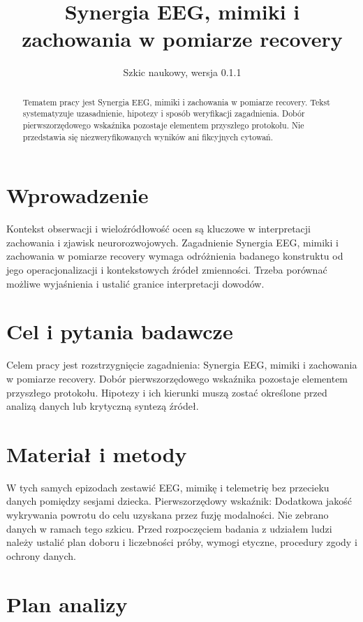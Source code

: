 \documentclass[11pt,a4paper]{article}
\title{Synergia EEG, mimiki i zachowania w pomiarze recovery}
\author{}
\date{Szkic naukowy, wersja 0.1.1}
\begin{document}
\maketitle

\begin{abstract}

Tematem pracy jest Synergia EEG, mimiki i zachowania w pomiarze recovery. Tekst systematyzuje uzasadnienie, hipotezy i sposób weryfikacji zagadnienia. Dobór pierwszorzędowego wskaźnika pozostaje elementem przyszłego protokołu. Nie przedstawia się niezweryfikowanych wyników ani fikcyjnych cytowań.

\end{abstract}

\section{Wprowadzenie}

Kontekst obserwacji i wieloźródłowość ocen są kluczowe w interpretacji zachowania i zjawisk neurorozwojowych. Zagadnienie Synergia EEG, mimiki i zachowania w pomiarze recovery wymaga odróżnienia badanego konstruktu od jego operacjonalizacji i kontekstowych źródeł zmienności. Trzeba porównać możliwe wyjaśnienia i ustalić granice interpretacji dowodów.

\section{Cel i pytania badawcze}

Celem pracy jest rozstrzygnięcie zagadnienia: Synergia EEG, mimiki i zachowania w pomiarze recovery. Dobór pierwszorzędowego wskaźnika pozostaje elementem przyszłego protokołu. Hipotezy i ich kierunki muszą zostać określone przed analizą danych lub krytyczną syntezą źródeł.

\section{Materiał i metody}

W tych samych epizodach zestawić EEG, mimikę i telemetrię bez przecieku danych pomiędzy sesjami dziecka. Pierwszorzędowy wskaźnik: Dodatkowa jakość wykrywania powrotu do celu uzyskana przez fuzję modalności. Nie zebrano danych w ramach tego szkicu. Przed rozpoczęciem badania z udziałem ludzi należy ustalić plan doboru i liczebności próby, wymogi etyczne, procedury zgody i ochrony danych.

\section{Plan analizy}
\end{document}
